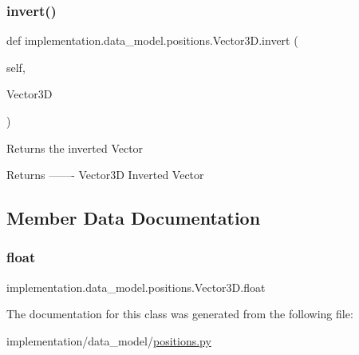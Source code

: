 \subsubsection{\texorpdfstring{invert()}{invert()}}
{\footnotesize\ttfamily def implementation.\+data\+\_\+model.\+positions.\+Vector3\+D.\+invert (\begin{DoxyParamCaption}\item[{}]{self,  }\item[{}]{Vector3D }\end{DoxyParamCaption})}

\begin{DoxyVerb}Returns the inverted Vector

Returns
-------
Vector3D
    Inverted Vector\end{DoxyVerb}
 

\subsection{Member Data Documentation}
\mbox{\label{classimplementation_1_1data__model_1_1positions_1_1_vector3_d_abb66fd44140d7eb3a383cdf27685741f}} 
\subsubsection{\texorpdfstring{float}{float}}
{\footnotesize\ttfamily implementation.\+data\+\_\+model.\+positions.\+Vector3\+D.\+float\hspace{0.3cm}{\ttfamily [static]}}



The documentation for this class was generated from the following file\+:\begin{DoxyCompactItemize}
\item 
implementation/data\+\_\+model/\hyperlink{positions_8py}{positions.\+py}\end{DoxyCompactItemize}
